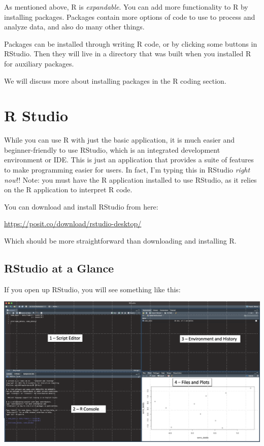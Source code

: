\documentclass[
  letterpaper,
  DIV=11,
  numbers=noendperiod]{scrreprt}
\begin{document}
As mentioned above, R is \emph{expandable}. You can add more
functionality to R by installing packages. Packages contain more options
of code to use to process and analyze data, and also do many other
things.

Packages can be installed through writing R code, or by clicking some
buttons in RStudio. Then they will live in a directory that was built
when you installed R for auxiliary packages.

We will discuss more about installing packages in the R coding section.

\chapter{R Studio}\label{r-studio}

While you can use R with just the basic application, it is much easier
and beginner-friendly to use RStudio, which is an integrated development
environment or IDE. This is just an application that provides a suite of
features to make programming easier for users. In fact, I'm typing this
in RStudio \emph{right now}!! Note: you must have the R application
installed to use RStudio, as it relies on the R application to interpret
R code.

You can download and install RStudio from here:

\url{https://posit.co/download/rstudio-desktop/}

Which should be more straightforward than downloading and installing R.

\section{RStudio at a Glance}\label{rstudio-at-a-glance}

If you open up RStudio, you will see something like this:

\includegraphics{rstudiowindow.png}
\end{document}
